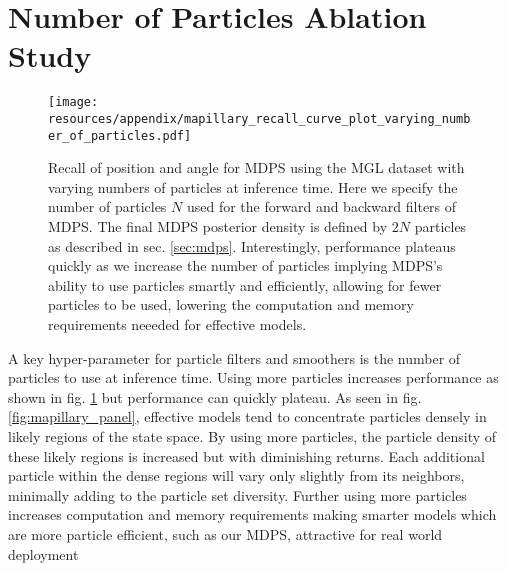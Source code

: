 \FloatBarrier
\newpage
\section{Number of Particles Ablation Study}

    
    \begin{figure}[ht]
        \centering
        \texttt{[image: resources/appendix/mapillary\_recall\_curve\_plot\_varying\_number\_of\_particles.pdf]}
        \caption{\small{Recall of position and angle for MDPS using the MGL dataset \cite{sarlin2023orienternet} with varying numbers of particles at inference time. Here we specify the number of particles $N$ used for the forward and backward filters of MDPS. The final MDPS posterior density is defined by $2N$ particles as described in sec. \ref{sec:mdps}. Interestingly, performance plateaus quickly as we increase the number of particles implying MDPS's ability to use particles smartly and efficiently, allowing for fewer particles to be used, lowering the computation and memory requirements neeeded for effective models.}}
        \label{appx_fig:mapillary_recall_vs_num_particles}
    \end{figure}

    A key hyper-parameter for particle filters and smoothers is the number of particles to use at inference time. Using more particles increases performance as shown in fig. \ref{appx_fig:mapillary_recall_vs_num_particles} but performance can quickly plateau. As seen in fig. \ref{fig:mapillary_panel}, effective models tend to concentrate particles densely in likely regions of the state space. By using more particles, the particle density of these likely regions is increased but with diminishing returns.  Each additional particle within the dense regions will vary only slightly from its neighbors, minimally adding to the particle set diversity. Further using more particles increases computation and memory requirements making smarter models which are more particle efficient, such as our MDPS, attractive for real world deployment
    